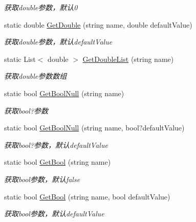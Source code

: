 \begin{DoxyCompactItemize}
\begin{DoxyCompactList}\small\item\em 获取double参数，默认0 \end{DoxyCompactList}\item 
static double \hyperlink{class_x_c_l_net_tools_1_1_string_hander_1_1_form_helper_a36ebb953cd52bbb1e999c98a163bd05a}{Get\+Double} (string name, double default\+Value)
\begin{DoxyCompactList}\small\item\em 获取double参数，默认default\+Value \end{DoxyCompactList}\item 
static List$<$ double $>$ \hyperlink{class_x_c_l_net_tools_1_1_string_hander_1_1_form_helper_a3e7cff936c30c0bdc0c61f2c34ca942d}{Get\+Double\+List} (string name)
\begin{DoxyCompactList}\small\item\em 获取double参数数组 \end{DoxyCompactList}\item 
static bool \hyperlink{class_x_c_l_net_tools_1_1_string_hander_1_1_form_helper_aaae65e05af2afe209759febba7ecdbd3}{Get\+Bool\+Null} (string name)
\begin{DoxyCompactList}\small\item\em 获取bool?参数 \end{DoxyCompactList}\item 
static bool \hyperlink{class_x_c_l_net_tools_1_1_string_hander_1_1_form_helper_a5ea790cf8ea2f82c6aa844b2bb1e2172}{Get\+Bool\+Null} (string name, bool?default\+Value)
\begin{DoxyCompactList}\small\item\em 获取bool?参数，默认default\+Value \end{DoxyCompactList}\item 
static bool \hyperlink{class_x_c_l_net_tools_1_1_string_hander_1_1_form_helper_a4eff1989f45cc5ae4608ba374956be17}{Get\+Bool} (string name)
\begin{DoxyCompactList}\small\item\em 获取bool参数，默认false \end{DoxyCompactList}\item 
static bool \hyperlink{class_x_c_l_net_tools_1_1_string_hander_1_1_form_helper_a449ca945de8a73643ac54eab5e37a3ef}{Get\+Bool} (string name, bool default\+Value)
\begin{DoxyCompactList}\small\item\em 获取bool参数，默认default\+Value \end{DoxyCompactList}\item 

\end{DoxyCompactItemize}

